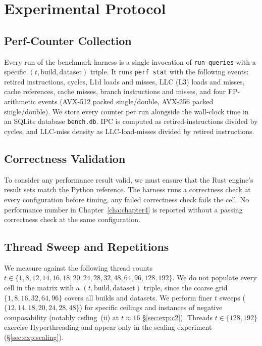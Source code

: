 \section{Experimental Protocol\label{sec:method:protocol}}

\subsection{Perf-Counter Collection}

Every run of the benchmark harness is a single invocation of \texttt{run-queries} with a specific $(t, \text{build}, \text{dataset})$ triple. It runs \texttt{perf stat} with the following events: retired instructions, cycles, L1d loads and misses, LLC (L3) loads and misses, cache references, cache misses, branch instructions and misses, and four FP-arithmetic events (AVX-512 packed single/double, AVX-256 packed single/double). We store every counter per run alongside the wall-clock time in an SQLite database \texttt{bench.db}. IPC is computed as retired-instructions divided by cycles, and LLC-miss density as LLC-load-misses divided by retired instructions.

\subsection{Correctness Validation\label{sec:correctness}}

To consider any performance result valid, we must ensure that the Rust engine's result sets match the Python reference. The harness runs a correctness check at every configuration before timing, any failed correctness check fails the cell. No performance number in Chapter~\ref{cha:chapter4} is reported without a passing correctness check at the same configuration.

\subsection{Thread Sweep and Repetitions}

We measure against the following thread counts $t \in \{1,\allowbreak 8,\allowbreak 12,\allowbreak 14,\allowbreak 16,\allowbreak 18,\allowbreak 20,\allowbreak 24,\allowbreak 28,\allowbreak 32,\allowbreak 48,\allowbreak 64,\allowbreak 96,\allowbreak 128,\allowbreak 192\}$. We do not populate every cell in the matrix with a $(t, \text{build}, \text{dataset})$ triple, since the coarse grid $\{1, 8, 16, 32, 64, 96\}$ covers all builds and datasets. We perform finer $t$ sweeps ($\{12, 14, 18, 20, 24, 28, 48\}$) for specific ceilings and instances of negative composability (notably ceiling~(ii) at $t \approx 16$  §\ref{sec:exp:c2}). Threads $t \in \{128, 192\}$ exercise Hyperthreading and appear only in the scaling experiment (§\ref{sec:exp:scaling}). 

